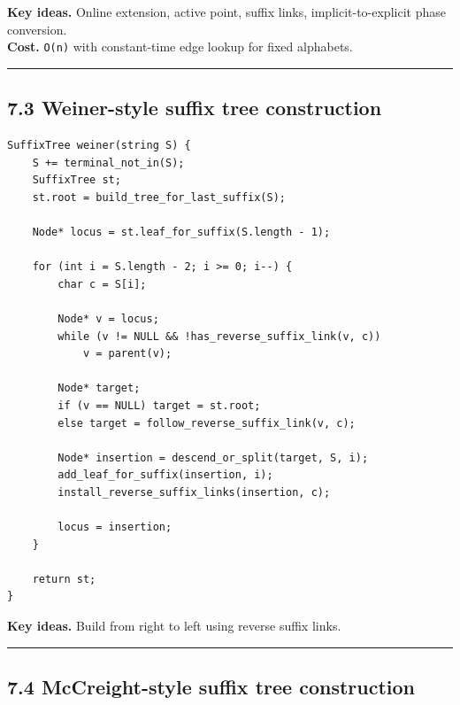 \documentclass[11pt]{article}
\begin{document}
\textbf{Key ideas.} Online extension, active point, suffix links, implicit-to-explicit phase conversion.\\
\textbf{Cost.} \texttt{O(n)} with constant-time edge lookup for fixed alphabets.

\begin{center}\rule{0.5\linewidth}{0.5pt}\end{center}

\subsection{7.3 Weiner-style suffix tree construction}\label{weiner-style-suffix-tree-construction}

\begin{verbatim}
SuffixTree weiner(string S) {
    S += terminal_not_in(S);
    SuffixTree st;
    st.root = build_tree_for_last_suffix(S);

    Node* locus = st.leaf_for_suffix(S.length - 1);

    for (int i = S.length - 2; i >= 0; i--) {
        char c = S[i];

        Node* v = locus;
        while (v != NULL && !has_reverse_suffix_link(v, c))
            v = parent(v);

        Node* target;
        if (v == NULL) target = st.root;
        else target = follow_reverse_suffix_link(v, c);

        Node* insertion = descend_or_split(target, S, i);
        add_leaf_for_suffix(insertion, i);
        install_reverse_suffix_links(insertion, c);

        locus = insertion;
    }

    return st;
}
\end{verbatim}

\textbf{Key ideas.} Build from right to left using reverse suffix links.

\begin{center}\rule{0.5\linewidth}{0.5pt}\end{center}

\subsection{7.4 McCreight-style suffix tree construction}\label{mccreight-style-suffix-tree-construction}
\end{document}
